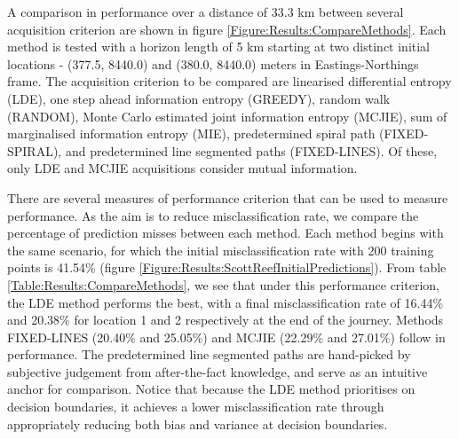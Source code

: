 \documentclass{article}
\begin{document}
		A comparison in performance over a distance of 33.3 km between several acquisition criterion are shown in figure \ref{Figure:Results:CompareMethods}. Each method is tested with a horizon length of 5 km starting at two distinct initial locations - (377.5, 8440.0) and (380.0, 8440.0) meters in Eastings-Northings frame. The acquisition criterion to be compared are linearised differential entropy (LDE), one step ahead information entropy (GREEDY), random walk (RANDOM), Monte Carlo estimated joint information entropy (MCJIE), sum of marginalised information entropy (MIE), predetermined spiral path (FIXED-SPIRAL), and predetermined line segmented paths (FIXED-LINES). Of these, only LDE and MCJIE acquisitions consider mutual information.

		  				
		There are several measures of performance criterion that can be used to measure performance. As the aim is to reduce misclassification rate, we compare the percentage of prediction misses between each method. Each method begins with the same scenario, for which the initial misclassification rate with 200 training points is 41.54\% (figure \ref{Figure:Results:ScottReefInitialPredictions}). From table \ref{Table:Results:CompareMethods}, we see that under this performance criterion, the LDE method performs the best, with a final misclassification rate of 16.44\% and 20.38\% for location 1 and 2 respectively at the end of the journey. Methods FIXED-LINES (20.40\% and 25.05\%) and MCJIE (22.29\% and 27.01\%) follow in performance. The predetermined line segmented paths are hand-picked by subjective judgement from after-the-fact knowledge, and serve as an intuitive anchor for comparison. Notice that because the LDE method prioritises on decision boundaries, it achieves a lower misclassification rate through appropriately reducing both bias and variance at decision boundaries.
	
\end{document}
